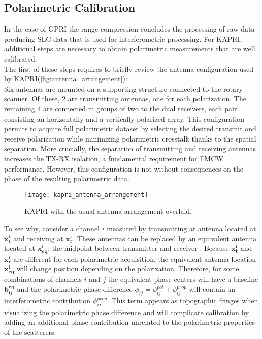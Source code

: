 \subsection{Polarimetric Calibration}\label{sec:proc_polcal}
In the case of GPRI the range compression concludes the processing of raw data producing SLC data that is used for interferometric processing.  For KAPRI, additional steps are necessary to obtain polarimetric measurements that are well calibrated.\\ The first of these steps requires to briefly review the antenna configuration used by KAPRI(\autoref{fig:antenna_arrangement}):\\ Six antennas are mounted on a supporting structure connected to the rotary scanner. Of these, 2 are transmitting antennas, one for each polarization. The remaining 4 are connected in groups of two to the dual receivers, each pair consisting an horizontally and a vertically polarized array. This configuration permits to acquire full polarimetric dataset by selecting the desired transmit and receive polarization while minimizing polarimetric crosstalk thanks to the spatial separation. More crucially, the separation of transmitting and receiving antennas increases the TX-RX isolation, a fundamental requirement for FMCW performance\cite{Beasley1990,Stove1992, Strozzi2011}.  However, this configuration is not without consequences on the phase of the resulting polarimetric data.
\begin{figure}[ht]
	\centering
	\texttt{[image: kapri\_antenna\_arrangement]}
	\caption{KAPRI with the usual antenna arrangement overlaid. }
	\label{fig:antenna_arrangement}
\end{figure}
To see why, consider a channel $i$ measured by transmitting at antenna located at $\mathbf{x_t^i}$ and receiving at $\mathbf{x_r^i}$. These antennas can be replaced by an equivalent antenna located at $\mathbf{x_{eq}^i}$, the midpoint between transmitter and receiver \cite{Pipia2009}. Because $\mathbf{x_t^i}$ and $\mathbf{x_r^i}$ are different for each polarimetric acquisition, the equivalent antenna location $\mathbf{x_{eq}^i}$  will change position depending on the polarization.  Therefore, for some combinations of channels $i$ and $j$ the equivalent phase centers will have a baseline $\mathbf{b_{ij}^{eq}}$ and the polarimetric phase difference $\phi_{ij} = \phi_{ij}^{pol} + \phi_{ij}^{prop}$  will contain an interferometric contribution $\phi_{ij}^{prop}$. This term appears as topographic fringes when visualizing the polarimetric phase difference and will complicate calibration by adding an additional phase contribution unrelated to the polarimetric properties of the scatterers.\\
